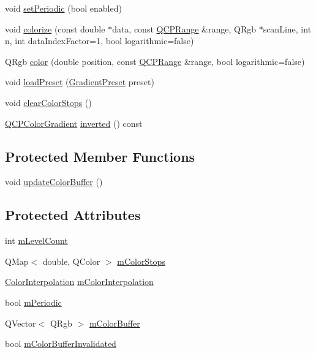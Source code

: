 \begin{DoxyCompactItemize}
\item 
void \hyperlink{classQCPColorGradient_a39d6448155fc00a219f239220d14bb39}{set\+Periodic} (bool enabled)
\item 
void \hyperlink{classQCPColorGradient_aaf423ceb943e177b0ed2c48c811d83dc}{colorize} (const double $\ast$data, const \hyperlink{classQCPRange}{Q\+C\+P\+Range} \&range, Q\+Rgb $\ast$scan\+Line, int n, int data\+Index\+Factor=1, bool logarithmic=false)
\item 
Q\+Rgb \hyperlink{classQCPColorGradient_a0599545c859268b025d2060dea741cea}{color} (double position, const \hyperlink{classQCPRange}{Q\+C\+P\+Range} \&range, bool logarithmic=false)
\item 
void \hyperlink{classQCPColorGradient_aa0aeec1528241728b9671bf8e60b1622}{load\+Preset} (\hyperlink{classQCPColorGradient_aed6569828fee337023670272910c9072}{Gradient\+Preset} preset)
\item 
void \hyperlink{classQCPColorGradient_a939213e85f0d1279519d555c5fcfb6ad}{clear\+Color\+Stops} ()
\item 
\hyperlink{classQCPColorGradient}{Q\+C\+P\+Color\+Gradient} \hyperlink{classQCPColorGradient_abe04e1d1ccab3d7aa78f2924faed4916}{inverted} () const 
\end{DoxyCompactItemize}
\subsection*{Protected Member Functions}
\begin{DoxyCompactItemize}
\item 
void \hyperlink{classQCPColorGradient_a353f15ab3ab586eebf1f6b58c3e2707b}{update\+Color\+Buffer} ()
\end{DoxyCompactItemize}
\subsection*{Protected Attributes}
\begin{DoxyCompactItemize}
\item 
int \hyperlink{classQCPColorGradient_a98fb68e359904b2c991fcae3e38a211a}{m\+Level\+Count}
\item 
Q\+Map$<$ double, Q\+Color $>$ \hyperlink{classQCPColorGradient_a9e11a2b0974ef289d12c324822bc3a3e}{m\+Color\+Stops}
\item 
\hyperlink{classQCPColorGradient_ac5dca17cc24336e6ca176610e7f77fc1}{Color\+Interpolation} \hyperlink{classQCPColorGradient_a028cef73d863800a9ee93ffd641cce01}{m\+Color\+Interpolation}
\item 
bool \hyperlink{classQCPColorGradient_a4b07deeb20ca1ee2d5ea7e01bf0420af}{m\+Periodic}
\item 
Q\+Vector$<$ Q\+Rgb $>$ \hyperlink{classQCPColorGradient_af8b5f0739faa5f8295154d47ce38ecff}{m\+Color\+Buffer}
\item 
bool \hyperlink{classQCPColorGradient_abacf55e11f67d6722a687af1bb2687bd}{m\+Color\+Buffer\+Invalidated}
\end{DoxyCompactItemize}


